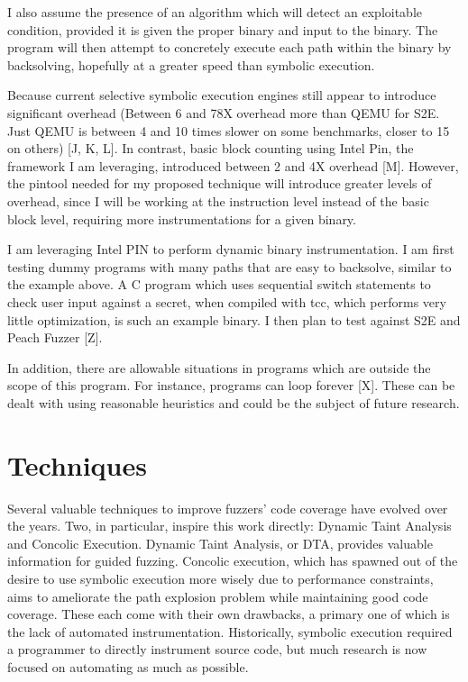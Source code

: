\documentclass[11pt,expanded,copyright]{fsuthesis}
\begin{document}
I also assume the presence of an algorithm which will detect an exploitable condition, provided it is given the proper binary and input to the binary. The program will then attempt to concretely execute each path within the binary by backsolving, hopefully at a greater speed than symbolic execution. 

Because current selective symbolic execution engines still appear to introduce significant overhead (Between 6 and 78X overhead more than QEMU for S2E. Just QEMU is between 4 and 10 times slower on some benchmarks, closer to 15 on others) [J, K, L]. In contrast, basic block counting using Intel Pin, the framework I am leveraging, introduced between 2 and 4X overhead [M]. However, the pintool needed for my proposed technique will introduce greater levels of overhead, since I will be working at the instruction level instead of the basic block level, requiring more instrumentations for a given binary.

I am leveraging Intel PIN to perform dynamic binary instrumentation. I am first testing dummy programs with many paths that are easy to backsolve, similar to the example above. A C program which uses sequential switch statements to check user input against a secret, when compiled with tcc, which performs very little optimization, is such an example binary. I then plan to test against S2E and Peach Fuzzer [Z]. 

In addition, there are allowable situations in programs which are outside the scope of this program. For instance, programs can loop forever [X]. These can be dealt with using reasonable heuristics and could be the subject of future research.

\chapter{Techniques}

Several valuable techniques to improve fuzzers' code coverage have evolved over the years. Two, in particular, inspire this work directly: Dynamic Taint Analysis and Concolic Execution. Dynamic Taint Analysis, or DTA, provides valuable information for guided fuzzing. Concolic execution, which has spawned out of the desire to use symbolic execution more wisely due to performance constraints, aims to ameliorate the path explosion problem while maintaining good code coverage. These each come with their own drawbacks, a primary one of which is the lack of automated instrumentation. Historically, symbolic execution required a programmer to directly instrument source code, but much research is now focused on automating as much as possible.
\end{document}

